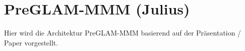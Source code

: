 \section{PreGLAM-MMM (Julius)}

Hier wird die Architektur PreGLAM-MMM basierend
auf der Präsentation / Paper vorgestellt.

